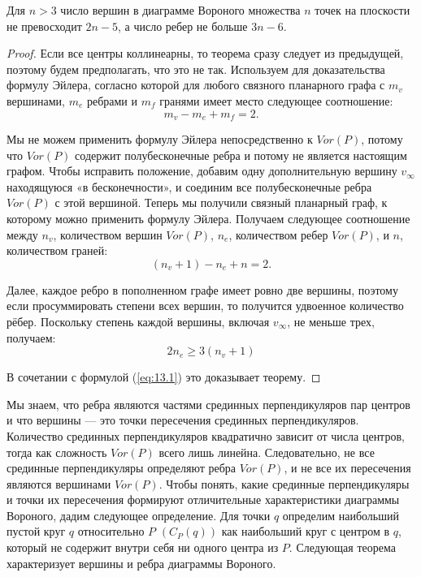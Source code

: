 \begin{theorem}
	Для  $n > 3$  число  вершин  в  диаграмме  Вороного  множества  $n$  точек  на плоскости  не  превосходит  $2 n - 5$,  а  число  ребер  не  больше  $3 n - 6$.
\end{theorem}
\begin{proof}
	Если  все  центры  коллинеарны,  то теорема  сразу  следует  из  предыдущей,  поэтому  будем предполагать,  что  это  не  так.
	Используем  для  доказательства  формулу  Эйлера,  согласно  которой  для  любого связного  планарного  графа  с $m_v$  вершинами,  $m_e$  ребрами и  $m_f$  гранями  имеет  место  следующее  соотношение: $$m_v - m_e + m_f = 2.$$
	
	Мы  не  можем  применить  формулу  Эйлера  непосредственно  к  $Vor(P)$,  потому  что  $Vor(P)$  содержит  полубесконечные  ребра  и  потому  не  является  настоящим  графом.
	Чтобы  исправить  положение,  добавим  одну  дополнительную  вершину $v_\infty$ находящуюся  «в  бесконечности»,  и соединим  все  полубесконечные  ребра  $Vor(P)$  с  этой  вершиной. 
	Теперь  мы  получили  связный  планарный  граф,  к которому  можно  применить  формулу  Эйлера. 
	Получаем следующее  соотношение  между  $n_v$,  количеством  вершин $Vor(P)$,  $n_e$,  количеством  ребер  $Vor(P)$,  и  $n$,  количеством граней: 
	\begin{equation}
		\label{eq:13.1}
		(n_v + 1) - n_e + n = 2.
	\end{equation}
	
	Далее,  каждое  ребро  в  пополненном  графе  имеет  ровно  две  вершины,  поэтому если  просуммировать  степени  всех  вершин,  то  получится  удвоенное  количество рёбер.
	Поскольку  степень  каждой  вершины,  включая  $v_\infty$,  не  меньше  трех,  получаем:
	\begin{equation}
		\label{eq:13.2}
		2 n_e \ge 3 (n_v + 1)
	\end{equation}
	
	В  сочетании  с  формулой  (\ref{eq:13.1})  это  доказывает  теорему.
\end{proof}

Мы  знаем,  что  ребра  являются частями  срединных  перпендикуляров  пар  центров  и  что  вершины  ---  это  точки  пересечения  срединных  перпендикуляров. 
Количество  срединных  перпендикуляров  квадратично  зависит  от числа  центров,  тогда  как  сложность  $Vor(P)$  всего  лишь  линейна.
Следовательно,  не  все  срединные  перпендикуляры  определяют  ребра  $Vor(P)$,  и  не все  их  пересечения  являются  вершинами  $Vor(P)$.
Чтобы  понять,  какие  срединные перпендикуляры  и  точки  их  пересечения  формируют  отличительные  характеристики  диаграммы  Вороного,  дадим  следующее  определение.
Для  точки  $q$  определим  наибольший  пустой  круг  $q$  относительно  $P$  $(C_P(q))$  как  наибольший  круг  с центром  в  $q$,  который  не  содержит  внутри  себя  ни  одного  центра  из  $P$. 
Следующая теорема  характеризует  вершины  и  ребра  диаграммы  Вороного.

